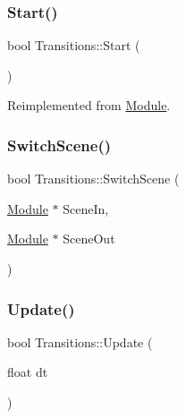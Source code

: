 \mbox{\label{class_transitions_abc46bf6e67d0936641cc1d41c20e8be9}} 
\subsubsection{\texorpdfstring{Start()}{Start()}}
{\footnotesize\ttfamily bool Transitions\+::\+Start (\begin{DoxyParamCaption}{ }\end{DoxyParamCaption})\hspace{0.3cm}{\ttfamily [virtual]}}



Reimplemented from \mbox{\hyperlink{class_module_aaf67046743296e8de310039a1dc95d86}{Module}}.

\mbox{\label{class_transitions_ae703df82a3b0e3868a69d31c10254c4d}} 
\subsubsection{\texorpdfstring{SwitchScene()}{SwitchScene()}}
{\footnotesize\ttfamily bool Transitions\+::\+Switch\+Scene (\begin{DoxyParamCaption}\item[{\mbox{\hyperlink{class_module}{Module}} $\ast$}]{Scene\+In,  }\item[{\mbox{\hyperlink{class_module}{Module}} $\ast$}]{Scene\+Out }\end{DoxyParamCaption})}

\mbox{\label{class_transitions_acd6dd9daa6a80dd1b1e8330aa06c21c9}} 
\subsubsection{\texorpdfstring{Update()}{Update()}}
{\footnotesize\ttfamily bool Transitions\+::\+Update (\begin{DoxyParamCaption}\item[{float}]{dt }\end{DoxyParamCaption})\hspace{0.3cm}{\ttfamily [virtual]}}



